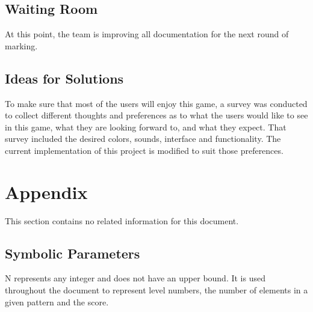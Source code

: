 \documentclass[12pt, titlepage]{article}
\begin{document}
\subsection{Waiting Room}
At this point, the team is improving all documentation for the next round of marking.

\subsection{Ideas for Solutions}
To make sure that most of the users will enjoy this game, a survey was conducted to collect different thoughts and preferences as to what the users would like to see in this game, what they are looking forward to, and what they expect. That survey included the desired colors, sounds, interface and functionality. The current implementation of this project is modified to suit those preferences.



\newpage
\section{Appendix}
This section contains no related information for this document.
\subsection{Symbolic Parameters}
N represents any integer and does not have an upper bound. It is used throughout the document to represent level numbers, the number of elements in a given pattern and the score.
\end{document}
